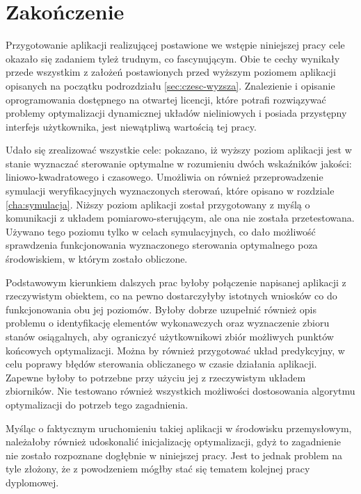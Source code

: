 \chapter*{Zakończenie}
\label{cha:zakonczenie}

Przygotowanie aplikacji realizującej postawione we wstępie niniejszej pracy cele okazało się zadaniem tyleż trudnym, co fascynującym. Obie te cechy wynikały przede wszystkim z założeń postawionych przed wyższym poziomem aplikacji opisanych na początku podrozdziału \ref{sec:czesc-wyzsza}. Znalezienie i opisanie oprogramowania dostępnego na otwartej licencji, które potrafi rozwiązywać problemy optymalizacji dynamicznej układów nieliniowych i posiada przystępny interfejs użytkownika, jest niewątpliwą wartością tej pracy.

Udało się zrealizować wszystkie cele: pokazano, iż wyższy poziom aplikacji jest w stanie wyznaczać sterowanie optymalne w rozumieniu dwóch wskaźników jakości: liniowo-kwadratowego i czasowego. Umożliwia on również przeprowadzenie symulacji weryfikacyjnych wyznaczonych sterowań, które opisano w rozdziale \ref{cha:symulacja}. Niższy poziom aplikacji został przygotowany z myślą o komunikacji z układem pomiarowo-sterującym, ale ona nie została przetestowana. Używano tego poziomu tylko w celach symulacyjnych, co dało możliwość sprawdzenia funkcjonowania wyznaczonego sterowania optymalnego poza środowiskiem, w którym zostało obliczone.

Podstawowym kierunkiem dalszych prac byłoby połączenie napisanej aplikacji z rzeczywistym obiektem, co na pewno dostarczyłyby istotnych wniosków co do funkcjonowania obu jej poziomów. Byłoby dobrze uzupełnić również opis problemu o identyfikację elementów wykonawczych oraz wyznaczenie zbioru stanów osiągalnych, aby ograniczyć użytkownikowi zbiór możliwych punktów końcowych optymalizacji. Można by również przygotować układ predykcyjny, w celu poprawy błędów sterowania obliczanego w czasie działania aplikacji. Zapewne byłoby to potrzebne przy użyciu jej z rzeczywistym układem zbiorników. Nie testowano również wszystkich możliwości dostosowania algorytmu optymalizacji do potrzeb tego zagadnienia.

Myśląc o faktycznym uruchomieniu takiej aplikacji w środowisku przemysłowym, należałoby również udoskonalić inicjalizację optymalizacji, gdyż to zagadnienie nie zostało rozpoznane dogłębnie w niniejszej pracy. Jest to jednak problem na tyle złożony, że z powodzeniem mógłby stać się tematem kolejnej pracy dyplomowej.
